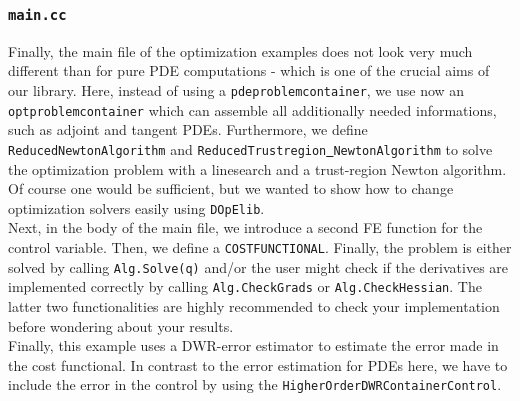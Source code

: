 \subsubsection{\texttt{main.cc}}
Finally, the main file of the optimization examples does not look very much 
different than for pure PDE computations - which is one of the crucial aims 
of our library. 
Here, instead of using a \texttt{pdeproblemcontainer}, we use 
now an \texttt{optproblemcontainer} which can assemble all additionally needed informations,
such as adjoint and tangent PDEs. 
Furthermore, we define \texttt{ReducedNewtonAlgorithm} and 
\texttt{ReducedTrustregion\underline{ }NewtonAlgorithm}
to solve the optimization problem with a linesearch and a trust-region Newton algorithm.
Of course one would be sufficient, but we wanted to show how to change optimization 
solvers easily using \texttt{DOpElib}.\\
Next, in the body of the main file, we introduce a second FE function for the 
control variable. Then, we define 
a \texttt{COSTFUNCTIONAL}. Finally, the problem is either solved 
by calling \texttt{Alg.Solve(q)} and/or the user might check if the 
derivatives are implemented correctly by calling 
\texttt{Alg.CheckGrads} or \texttt{Alg.CheckHessian}. The latter 
two functionalities are highly recommended to check your
implementation before wondering about your results.\\
Finally, this example uses a DWR-error estimator to estimate the 
error made in the cost functional. In contrast to the 
error estimation for PDEs here, we have to include the error in the
control by using the \texttt{HigherOrderDWRContainerControl}.
